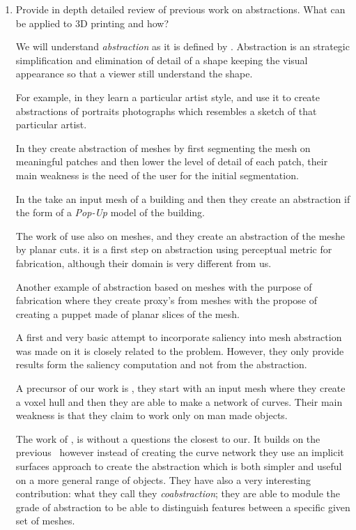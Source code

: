 \begin{enumerate}
  
	\item Provide in depth detailed review of previous work on abstractions. What can be applied to 3D printing and how?
	
		We will understand \emph{abstraction} as it is defined by \cite{Mi2009}. Abstraction is an strategic simplification and elimination of detail of a shape  keeping the visual appearance so that a viewer still understand the shape.
		
		For example, in \cite{Berger2013} they learn a particular artist style, and use it to create abstractions of portraits photographs which resembles a sketch of that particular artist.
		
		In \cite{DeGoes2011} they create abstraction of meshes by first segmenting the mesh on meaningful patches and then lower the level of detail of each patch, their main weakness is the need of the user for the initial segmentation. 
		
		In \cite{Li2010} the take an input mesh of a building and then they create an abstraction if the form of a \emph{Pop-Up} model of the building. 
		
		The work of \cite{Hildebrand2012} use also on meshes, and they create an abstraction of the meshe by planar cuts.
		it is a first step on abstraction using perceptual metric for fabrication, although their domain is very different from us. 
		
		Another example of abstraction based on meshes with the purpose of fabrication \cite{McCrae2011} where they create proxy’s from meshes with the propose of creating a puppet made of planar slices of the mesh.
		
		A first and very basic attempt to incorporate saliency into mesh abstraction was made on \cite{Yang2009} it is closely related to the problem. However, they only provide results form the saliency computation and not from the abstraction. 
		
		A precursor of our work is \cite{Mehra2009}, they start with an input mesh where they create a voxel hull and then they are able to make a network of curves. Their main weakness is that they claim to work only on man made objects.
		
		The work of \cite{Yumer2012}, is without a questions the closest to our. It builds on the previous~\cite{Mehra2009} however instead of creating the curve network they use an implicit surfaces approach to create the abstraction which is both simpler and useful on a more general range of objects. They have also a very interesting contribution: what they call they \emph{coabstraction}; they are able to module the grade of abstraction to be able to distinguish features between a specific given set of meshes.
	


\end{enumerate}
